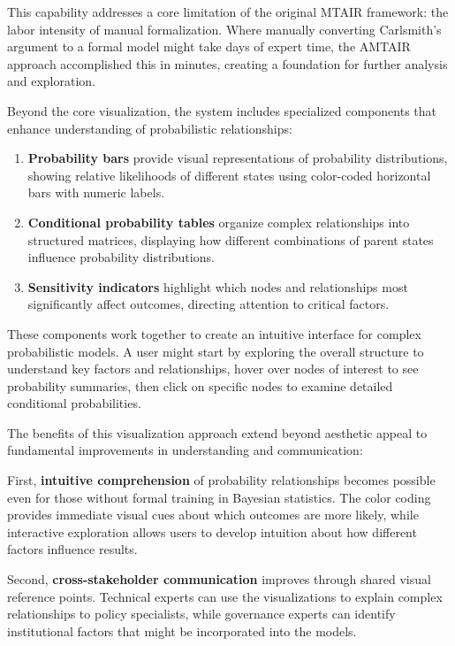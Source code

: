 \documentclass[
  11pt,
  letterpaper,
]{book}
\begin{document}
\begin{landscape}
This capability addresses a core limitation of the original MTAIR
framework: the labor intensity of manual formalization. Where manually
converting Carlsmith's argument to a formal model might take days of
expert time, the AMTAIR approach accomplished this in minutes, creating
a foundation for further analysis and exploration.

Beyond the core visualization, the system includes specialized
components that enhance understanding of probabilistic relationships:

\begin{enumerate}
\def\labelenumi{\arabic{enumi}.}
\item
  \textbf{Probability bars} provide visual representations of
  probability distributions, showing relative likelihoods of different
  states using color-coded horizontal bars with numeric labels.
\item
  \textbf{Conditional probability tables} organize complex relationships
  into structured matrices, displaying how different combinations of
  parent states influence probability distributions.
\item
  \textbf{Sensitivity indicators} highlight which nodes and
  relationships most significantly affect outcomes, directing attention
  to critical factors.
\end{enumerate}

These components work together to create an intuitive interface for
complex probabilistic models. A user might start by exploring the
overall structure to understand key factors and relationships, hover
over nodes of interest to see probability summaries, then click on
specific nodes to examine detailed conditional probabilities.

The benefits of this visualization approach extend beyond aesthetic
appeal to fundamental improvements in understanding and communication:

First, \textbf{intuitive comprehension} of probability relationships
becomes possible even for those without formal training in Bayesian
statistics. The color coding provides immediate visual cues about which
outcomes are more likely, while interactive exploration allows users to
develop intuition about how different factors influence results.

Second, \textbf{cross-stakeholder communication} improves through shared
visual reference points. Technical experts can use the visualizations to
explain complex relationships to policy specialists, while governance
experts can identify institutional factors that might be incorporated
into the models.


\end{landscape}
\end{document}
